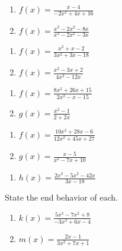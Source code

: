 \begin{multicols}{2}
\begin{enumerate}	\setcounter{enumi}{\value{Review}}
	\item $f(x) = \frac{x-4}{-2x^2+4x+16}$
	\item $f(x) = \frac{x^3-2x^2-8x}{x^3-2x^2-3x}$
\end{enumerate} \setcounter{Review}{\value{enumi}}
\end{multicols}
\begin{multicols}{2}
\begin{enumerate}	\setcounter{enumi}{\value{Review}}
	\item $f(x) = \frac{x^2+x-2}{3x^2+3x-18}$
	\item $f(x) = \frac{x^2-3x+2}{4x^2-12x}$
\end{enumerate}	\setcounter{Review}{\value{enumi}}
\end{multicols}
\begin{multicols}{2}
\begin{enumerate}	\setcounter{enumi}{\value{Review}}
	\item $f(x) = \frac{8x^2+26x+15}{2x^2-x-15}$
	\item $g(x) = \frac{x^2-1}{2+2x}$
\end{enumerate}	\setcounter{Review}{\value{enumi}}
\end{multicols}
\begin{multicols}{2}
\begin{enumerate}	\setcounter{enumi}{\value{Review}}
	\item $f(x) = \frac{10x^2 + 28x - 6}{12x^2+45x+27}$
	\item $g(x) = \frac{x-5}{x^2-7x+10}$
\end{enumerate}	\setcounter{Review}{\value{enumi}}
\end{multicols}
\begin{multicols}{2}
\begin{enumerate}	\setcounter{enumi}{\value{Review}}
	\item $h(x) = \frac{2x^3-5x^2-42x}{3x-18}$
\end{enumerate}	\setcounter{Review}{\value{enumi}}
\end{multicols}
\vspace{0.25in}

State the end behavior of each.
\begin{enumerate}	\setcounter{enumi}{\value{Review}}
	\item $k(x) = \frac{5x^3-7x^2+8}{-3x^3+6x-4}$
	\item $m(x) = \frac{2x-1}{3x^2+7x+1}$
\end{enumerate}	\setcounter{Review}{\value{enumi}}

